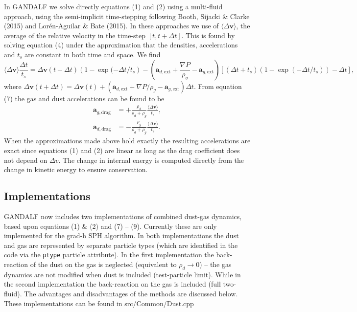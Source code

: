 \documentclass[a4paper]{article}
\renewcommand{\vec}[1]{\ensuremath{\mathbf{#1}}}
\begin{document}
In GANDALF we solve directly equations (1) and (2) using a multi-fluid approach, using the semi-implicit time-stepping following Booth, Sijacki \& Clarke (2015) and Lor\'en-Aguilar \& Bate (2015). In these approaches we use of $\langle \Delta \vec{v} \rangle$, the average of the relative velocity in the time-step $\left[ t,t + \Delta t\right]$. This is found by solving equation (4) under the approximation that the densities, accelerations and $t_s$ are constant in both time and space. We find 
\begin{equation}
\langle \Delta \vec{v} \rangle \frac{\Delta t}{t_s} = \Delta \vec{v}(t+\Delta t) \left(1 - \exp(-\Delta t/ t_s\right) -
\left(\vec{a}_{d, \mathrm{ext}} + \frac{\nabla P}{\rho_g}  - \vec{a}_{g, \mathrm{ext}}\right)\left[(\Delta t + t_s)\left(1 - \exp(-\Delta t/ t_s)\right) - \Delta t \right],
\end{equation}
where $ \Delta \vec{v}(t+\Delta t) = \Delta \vec{v} (t) + \left(\vec{a}_{d, \mathrm{ext}} + \nabla P/\rho_g  - \vec{a}_{g, \mathrm{ext}}\right) \Delta t$. From equation (7) the gas and dust accelerations can be found to be
\begin{align}
\vec{a}_{g,\mathrm{drag}} &= + \frac{\rho_d}{\rho_d + \rho_g} \frac{\langle \Delta \vec{v} \rangle}{t_s}, \\
\vec{a}_{d,\mathrm{drag}} &= - \frac{\rho_g}{\rho_d + \rho_g} \frac{\langle \Delta \vec{v} \rangle}{t_s}.
\end{align}
When the approximations made above hold exactly the resulting accelerations are exact since equations (1) and (2) are linear as long as the drag coefficient does not depend on $\Delta v$. The change in internal energy is computed directly from the change in kinetic energy to ensure conservation.

\subsection{Implementations}

GANDALF now includes two implementations of combined dust-gas dynamics, based upon equations (1) \& (2) and  (7) -- (9). Currently these are only implemented for the grad-h SPH algorithm. In both implementations the dust and gas are represented by separate particle types (which are identified in the code via the \lstinline{ptype} particle attribute). In the first implementation the back-reaction of the dust on the gas is neglected (equivalent to  $\rho_d \rightarrow 0$) -- the gas dynamics are not modified when dust is included (test-particle limit). While in the second implementation the back-reaction on the gas is included (full two-fluid). The advantages and disadvantages of the methods are discussed below. These implementations can be found in src/Common/Dust.cpp
\end{document}
